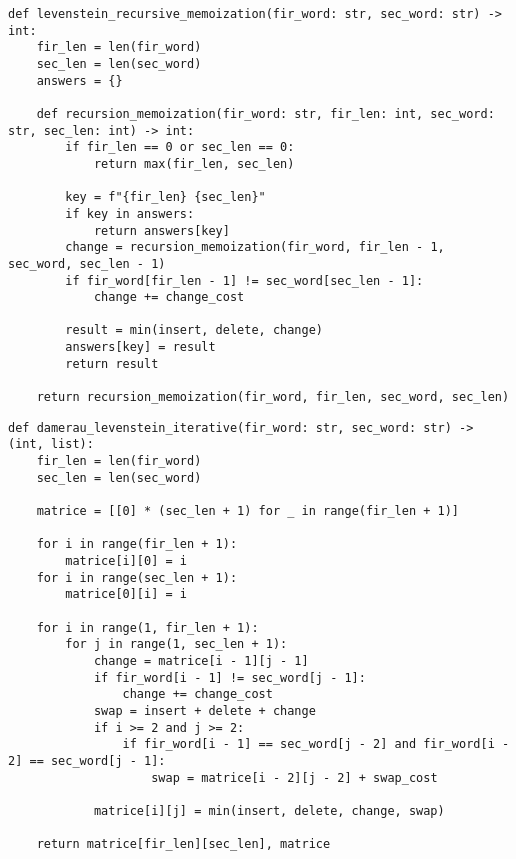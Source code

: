 \documentclass[a4paper,14pt, unknownkeysallowed]{extreport}
\begin{document}
\begin{center}
\captionsetup{justification=raggedright,singlelinecheck=off}
\begin{lstlisting}[label=lst:lev_recursive_hash,caption=Реализация нахождения расстояния Левенштейна рекурсивно с кэшированием]
def levenstein_recursive_memoization(fir_word: str, sec_word: str) -> int:
    fir_len = len(fir_word)
    sec_len = len(sec_word)
    answers = {}

    def recursion_memoization(fir_word: str, fir_len: int, sec_word: str, sec_len: int) -> int:
        if fir_len == 0 or sec_len == 0:
            return max(fir_len, sec_len)

        key = f"{fir_len} {sec_len}"
        if key in answers:
            return answers[key]
        change = recursion_memoization(fir_word, fir_len - 1, sec_word, sec_len - 1)
        if fir_word[fir_len - 1] != sec_word[sec_len - 1]:
            change += change_cost

        result = min(insert, delete, change)
        answers[key] = result
        return result

    return recursion_memoization(fir_word, fir_len, sec_word, sec_len)
\end{lstlisting}
\end{center}

\clearpage

\begin{center}
\captionsetup{justification=raggedright,singlelinecheck=off}
\begin{lstlisting}[label=lst:dam_lev_iterative,caption=Реализация итерационного нахождения расстояния Дамерау–Левенштейна]
def damerau_levenstein_iterative(fir_word: str, sec_word: str) -> (int, list):
    fir_len = len(fir_word)
    sec_len = len(sec_word)

    matrice = [[0] * (sec_len + 1) for _ in range(fir_len + 1)]

    for i in range(fir_len + 1):
        matrice[i][0] = i
    for i in range(sec_len + 1):
        matrice[0][i] = i

    for i in range(1, fir_len + 1):
        for j in range(1, sec_len + 1):
            change = matrice[i - 1][j - 1]
            if fir_word[i - 1] != sec_word[j - 1]:
                change += change_cost
            swap = insert + delete + change
            if i >= 2 and j >= 2:
                if fir_word[i - 1] == sec_word[j - 2] and fir_word[i - 2] == sec_word[j - 1]:
                    swap = matrice[i - 2][j - 2] + swap_cost

            matrice[i][j] = min(insert, delete, change, swap)

    return matrice[fir_len][sec_len], matrice
\end{lstlisting}
\end{center}
\end{document}
